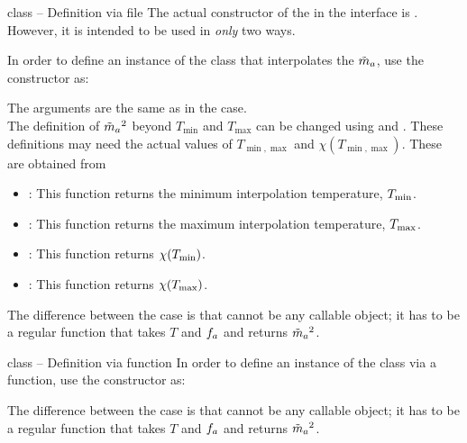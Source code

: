 \documentclass[10pt,utf8,compress,xcolor=dvipsnames]{beamer}
\begin{document}
\begin{frame}{ class -- Definition via file}
	\fontB
	The actual constructor of the  in the \PY interface is . However, it is intended to be used in {\em only} two ways. 
	
	In order to define an instance of the  class that interpolates the $\tilde m_{a}{}$, use the constructor as:
	\lstset{language = python}
	
	The arguments are the same as in the \CPP case. \\[0.5cm]
	
	The definition of $\tilde m_{a}{}^2$ beyond $T_{\min}$ and $T_{\max}$ can be changed using   and . These definitions may need the actual values of   $T_{\min,\max}$ and $\chi(T_{\min,\max})$. These are obtained from
	\begin{itemize}
		\item {}: This function returns the minimum interpolation temperature, $T_{\rm min}$. 
		\item {}: This function returns the maximum interpolation temperature, $T_{\rm max}$.
		\item {}: This function returns $\chi(T_{\rm min})$.
		\item {}: This function returns $\chi(T_{\rm max})$.
	\end{itemize}
	
	The difference between the \CPP case is that  cannot be any callable object; it has to be a regular function that takes $T$ and $f_{a}{}$ and returns $\tilde m_{a}{}^2$.
\end{frame}

\begin{frame}{ class -- Definition via function}
	\fontB
	In order to define an instance of the  class via a function, use the constructor as:
	\lstset{language = python}
	

	The difference between the \CPP case is that  cannot be any callable object; it has to be a regular function that takes $T$ and $f_{a}{}$ and returns $\tilde m_{a}{}^2$.
\end{frame}
\end{document}
